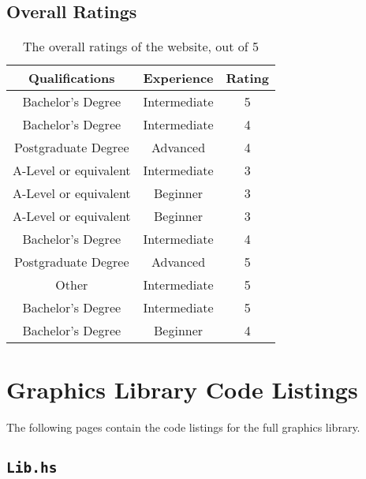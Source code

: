 \documentclass[../main.tex]{subfiles}
\begin{document}
        \section*{Overall Ratings}
            \begin{table}[H]
                \centering
                \begin{tabular}{c|c|c}
                    \textbf{Qualifications} & \textbf{Experience} & \textbf{Rating} \\
                    \hline
                    Bachelor's Degree       & Intermediate        & 5               \\
                    Bachelor's Degree       & Intermediate        & 4               \\
                    Postgraduate Degree     & Advanced            & 4               \\
                    A-Level or equivalent   & Intermediate        & 3               \\
                    A-Level or equivalent   & Beginner            & 3               \\
                    A-Level or equivalent   & Beginner            & 3               \\
                    Bachelor's Degree       & Intermediate        & 4               \\
                    Postgraduate Degree     & Advanced            & 5               \\
                    Other                   & Intermediate        & 5               \\
                    Bachelor's Degree       & Intermediate        & 5               \\
                    Bachelor's Degree       & Beginner            & 4               \\
                \end{tabular}
                \caption{The overall ratings of the website, out of 5}
            \end{table}

    \chapter{Graphics Library Code Listings} \label{app:code}
        The following pages contain the code listings for the full graphics library.
        \section*{\texttt{Lib.hs}}
            
\end{document}

